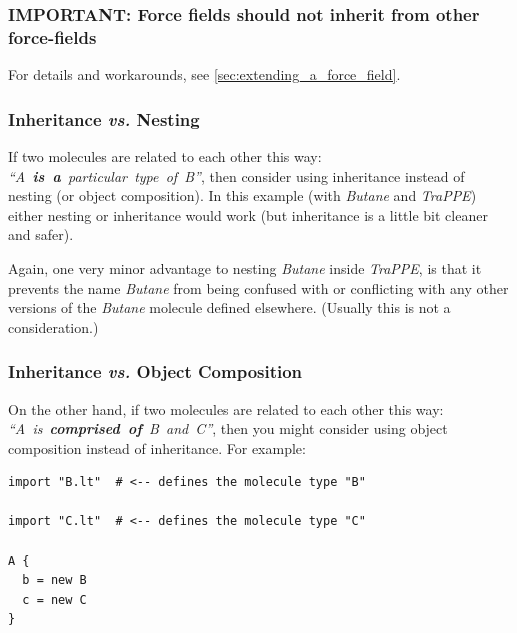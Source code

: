 \documentclass[11pt]{article}
\begin{document}
\subsubsection*{IMPORTANT: Force fields should not inherit from other force-fields}
For details and workarounds, see \ref{sec:extending_a_force_field}.


\subsubsection{Inheritance \textit{vs.} Nesting}
\label{sec:inheritance_vs_nesting}
If two molecules are related to each other this way:
\mbox{\textit{``A \textbf{is a} particular type of B''}},
then consider using inheritance instead of nesting
(or object composition).
In this example (with \textit{Butane} and \textit{TraPPE})
either nesting or inheritance would work
(but inheritance is a little bit cleaner and safer).

  Again, one very minor advantage to nesting 
\textit{Butane} inside \textit{TraPPE}, is that it prevents the name
\textit{Butane} from being confused with or conflicting with any other 
versions of the \textit{Butane} molecule defined elsewhere.
(Usually this is not a consideration.)

\subsubsection{Inheritance \textit{vs.} Object Composition}
\label{sec:inheritance_vs_object_composition}
On the other hand, if two molecules are related to each other this way:
\mbox{\textit{``A is \textbf{comprised of} B and C''}},
then you might consider using object composition instead of inheritance.
For example:
\begin{verbatim}
import "B.lt"  # <-- defines the molecule type "B"

import "C.lt"  # <-- defines the molecule type "C"

A {
  b = new B
  c = new C
}
\end{verbatim}
\end{document}

